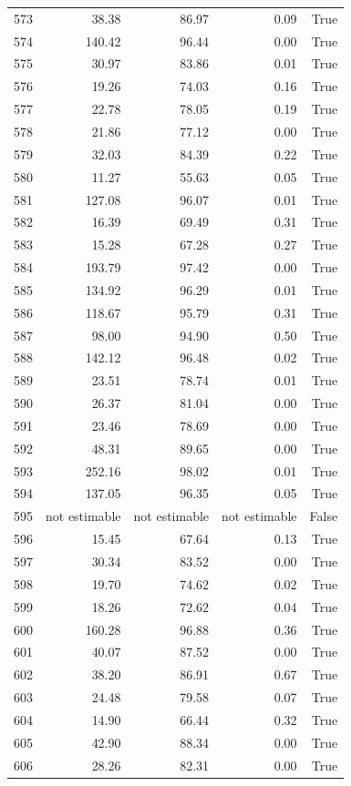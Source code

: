\begin{longtable}{rrrrr}
573 & 38.38 & 86.97 & 0.09 & True \\
574 & 140.42 & 96.44 & 0.00 & True \\
575 & 30.97 & 83.86 & 0.01 & True \\
576 & 19.26 & 74.03 & 0.16 & True \\
577 & 22.78 & 78.05 & 0.19 & True \\
578 & 21.86 & 77.12 & 0.00 & True \\
579 & 32.03 & 84.39 & 0.22 & True \\
580 & 11.27 & 55.63 & 0.05 & True \\
581 & 127.08 & 96.07 & 0.01 & True \\
582 & 16.39 & 69.49 & 0.31 & True \\
583 & 15.28 & 67.28 & 0.27 & True \\
584 & 193.79 & 97.42 & 0.00 & True \\
585 & 134.92 & 96.29 & 0.01 & True \\
586 & 118.67 & 95.79 & 0.31 & True \\
587 & 98.00 & 94.90 & 0.50 & True \\
588 & 142.12 & 96.48 & 0.02 & True \\
589 & 23.51 & 78.74 & 0.01 & True \\
590 & 26.37 & 81.04 & 0.00 & True \\
591 & 23.46 & 78.69 & 0.00 & True \\
592 & 48.31 & 89.65 & 0.00 & True \\
593 & 252.16 & 98.02 & 0.01 & True \\
594 & 137.05 & 96.35 & 0.05 & True \\
595 & not estimable & not estimable & not estimable & False \\
596 & 15.45 & 67.64 & 0.13 & True \\
597 & 30.34 & 83.52 & 0.00 & True \\
598 & 19.70 & 74.62 & 0.02 & True \\
599 & 18.26 & 72.62 & 0.04 & True \\
600 & 160.28 & 96.88 & 0.36 & True \\
601 & 40.07 & 87.52 & 0.00 & True \\
602 & 38.20 & 86.91 & 0.67 & True \\
603 & 24.48 & 79.58 & 0.07 & True \\
604 & 14.90 & 66.44 & 0.32 & True \\
605 & 42.90 & 88.34 & 0.00 & True \\
606 & 28.26 & 82.31 & 0.00 & True \\

\end{longtable}
